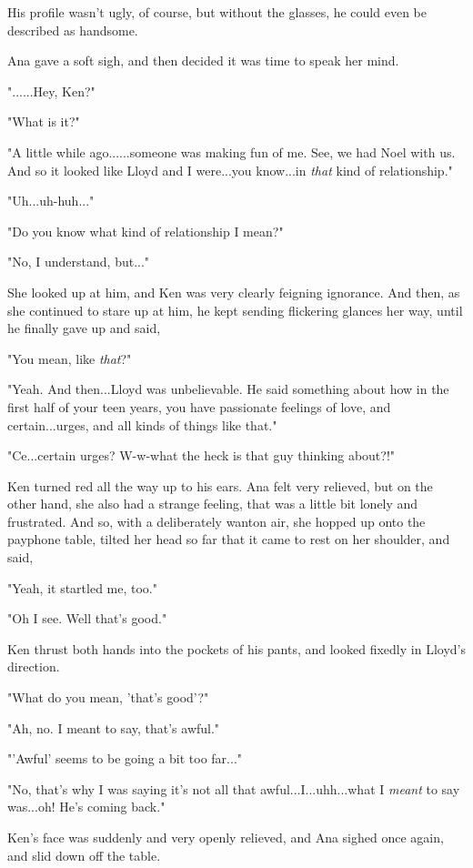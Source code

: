 \documentclass[
]{article}
\begin{document}
His profile wasn't ugly, of course, but without the glasses, he could
even be described as handsome.

Ana gave a soft sigh, and then decided it was time to speak her mind.

"......Hey, Ken?"

"What is it?"

"A little while ago......someone was making fun of me. See, we had Noel
with us. And so it looked like Lloyd and I were...you know...in
\emph{that} kind of relationship."

"Uh...uh-huh..."

"Do you know what kind of relationship I mean?"

"No, I understand, but..."

She looked up at him, and Ken was very clearly feigning ignorance. And
then, as she continued to stare up at him, he kept sending flickering
glances her way, until he finally gave up and said,

"You mean, like \emph{that}?"

"Yeah. And then...Lloyd was unbelievable. He said something about how in
the first half of your teen years, you have passionate feelings of love,
and certain...urges, and all kinds of things like that."

"Ce...certain urges? W-w-what the heck is that guy thinking about?!"

Ken turned red all the way up to his ears. Ana felt very relieved, but
on the other hand, she also had a strange feeling, that was a little bit
lonely and frustrated. And so, with a deliberately wanton air, she
hopped up onto the payphone table, tilted her head so far that it came
to rest on her shoulder, and said,

"Yeah, it startled me, too."

"Oh I see. Well that's good."

Ken thrust both hands into the pockets of his pants, and looked fixedly
in Lloyd's direction.

"What do you mean, 'that's good'?"

"Ah, no. I meant to say, that's awful."

"'Awful' seems to be going a bit too far..."

"No, that's why I was saying it's not all that awful...I...uhh...what I
\emph{meant} to say was...oh! He's coming back."

Ken's face was suddenly and very openly relieved, and Ana sighed once
again, and slid down off the table.
\end{document}
